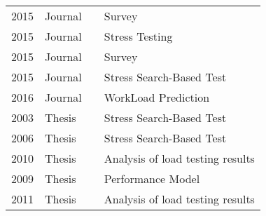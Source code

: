 \begin{longtable}{llll}
2015          & Journal          & \cite{Jiang2015}                & Survey                           \\
2015          & Journal          & \cite{Luo2015}                  & Stress Testing                   \\
2015          & Journal          & \cite{Harman2015}               & Survey                           \\
2015          & Journal          & \cite{Alesio2015}               & Stress Search-Based Test         \\
2016          & Journal          & \cite{Vogele2016}               & WorkLoad Prediction              \\
2003          & Thesis           & \cite{Shousha2003}              & Stress Search-Based Test         \\
2006          & Thesis           & \cite{Garousi2006}              & Stress Search-Based Test         \\
2010          & Thesis           & \cite{Jiang2010}                & Analysis of load testing results \\
2009          & Thesis           & \cite{Ganapathi2009}            & Performance Model                \\
2011          & Thesis           & \cite{Vetoio2011}               & Analysis of load testing results
\end{longtable}


